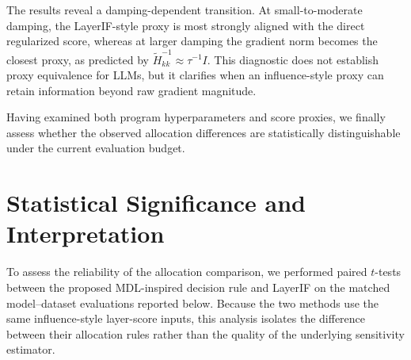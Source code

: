 \documentclass[accepted]{uai2026}%
\theoremstyle{remark}%
\begin{document}
The results reveal a damping-dependent transition. At small-to-moderate
damping, the LayerIF-style proxy is most strongly aligned with the direct
regularized score, whereas at larger damping the gradient norm becomes the
closest proxy, as predicted by
$\widetilde H_{kk}^{-1}\approx \tau^{-1}I$. This diagnostic does not establish
proxy equivalence for LLMs, but it clarifies when an influence-style proxy can
retain information beyond raw gradient magnitude.

Having examined both program hyperparameters and score proxies, we finally
assess whether the observed allocation differences are statistically
distinguishable under the current evaluation budget.

\section{Statistical Significance and Interpretation}
To assess the reliability of the allocation comparison, we performed paired
$t$-tests between the proposed MDL-inspired decision rule and LayerIF on the
matched model--dataset evaluations reported below. Because the two methods use
the same influence-style layer-score inputs, this analysis isolates the
difference between their allocation rules rather than the quality of the
underlying sensitivity estimator.
\end{document}
